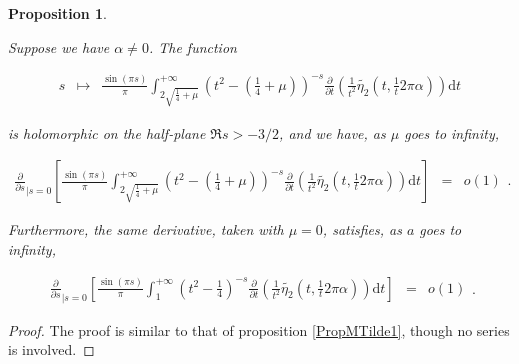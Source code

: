\documentclass{jams-l}
\newtheorem{proposition}[theorem]{Proposition}
\theoremstyle{definition}
\theoremstyle{remark}
\numberwithin{equation}{section}
\begin{document}
                \begin{proposition}
                \label{PropMTilde1-0}
                
                    Suppose we have $\alpha \neq 0$. The function
                    
                    \[ \begin{array}{lll}
                            s & \longmapsto & \frac{\sin \left( \pi s \right)}{\pi} \int_{2 \sqrt{\frac{1}{4} + \mu}}^{+ \infty} \left( t^2 - \left( \frac{1}{4} + \mu \right) \right)^{-s} \frac{\partial}{\partial t} \left( \frac{1}{t^2} \widetilde{\eta_2} \left( t, \frac{1}{t} 2 \pi \alpha \right) \right) \mathrm{d}t
                        \end{array} \]
                    
                    \noindent is holomorphic on the half-plane $\Re s > -3/2$, and we have, as $\mu$ goes to infinity,
                    
                    \[ \begin{array}{lll}
                            \frac{\partial}{\partial s}_{\left \vert s = 0 \right.} \left[ \frac{\sin \left( \pi s \right)}{\pi} \int_{2 \sqrt{\frac{1}{4} + \mu}}^{+ \infty} \left( t^2 - \left( \frac{1}{4} + \mu \right) \right)^{-s} \frac{\partial}{\partial t} \left( \frac{1}{t^2} \widetilde{\eta_2} \left( t, \frac{1}{t} 2 \pi \alpha \right) \right) \mathrm{d}t \right] & = & o \left( 1 \right)
                        \end{array} . \]
                    
                    \noindent Furthermore, the same derivative, taken with $\mu = 0$, satisfies, as $a$ goes to infinity,
                    
                    \[ \begin{array}{lll}
                            \frac{\partial}{\partial s}_{\left \vert s = 0 \right.} \left[ \frac{\sin \left( \pi s \right)}{\pi} \int_1^{+ \infty} \left( t^2 - \frac{1}{4} \right)^{-s} \frac{\partial}{\partial t} \left( \frac{1}{t^2} \widetilde{\eta_2} \left( t, \frac{1}{t} 2 \pi \alpha \right) \right) \mathrm{d}t \right] & = & o \left( 1 \right)
                        \end{array} . \]
                
                \end{proposition}
                
                \begin{proof}
                
                    The proof is similar to that of proposition \ref{PropMTilde1}, though no series is involved.
                
                \end{proof}
                
\end{document}
